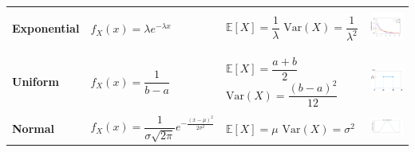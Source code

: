 \documentclass[a4paper,10pt,landscape]{article}
\newcommand{\var}{\textrm{Var}}
\begin{document}
\begin{table}[h!]
\begin{tabular}{| C{4.5cm} | C{7cm} | C{6cm} | C{7cm} |}
		&&&\\ \hline
		&&&\\
		{\bf Exponential} & $f_X(x)=\lambda e^{-\lambda x}$ & $\mathbb{E}[X]=\dfrac{1}{\lambda}$ \newline\vspace*{3pt}$\var(X)=\dfrac{1}{\lambda^2}$ & \includegraphics[width=3.75cm]{exponential.png}\\
		&&&\\ \hline
		&&&\\
		{\bf Uniform} & $f_X(x)=\dfrac{1}{b-a}$ & $\mathbb{E}[X]=\dfrac{a+b}{2}$ \newline\vspace*{3pt}$\var(X)=\dfrac{(b-a)^2}{12}$ & \includegraphics[width=3.75cm]{uniform.png} \\ \hline
		&&&\\
		{\bf Normal} & $f_X(x)=\dfrac{1}{\sigma\sqrt{2\pi}}e^{-\frac{(x-\mu)^2}{2\sigma^2}}$& $\mathbb{E}[X]=\mu$ \newline\vspace*{3pt}$\var(X)=\sigma^2$ & \includegraphics[width=3.75cm]{standardnormal.png}\\ \hline
	\end{tabular}
\end{table}
\end{document}

